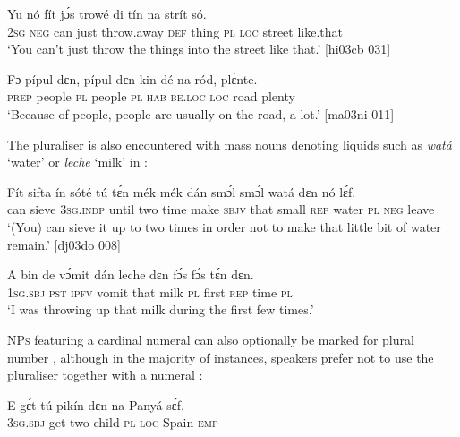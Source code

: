 \ea%
    \label{ex:key:207}
    \gll Yu  nó  fít  jɔ́s  trowé    di  tín    na  strít    só.\\
\textsc{2sg}  \textsc{neg}  can  just  throw.away  \textsc{def}  thing  \textsc{pl}  \textsc{loc}  street  like.that\\

\glt ‘You can’t just throw the things into the street like that.’ [hi03cb 031]
\z


\ea%
    \label{ex:key:208}
    \gll Fɔ  pípul  dɛn,    pípul  dɛn  kin  dé    na  ród,    plɛ́nte.\\
\textsc{prep}  people  \textsc{pl}    people  \textsc{pl}  \textsc{hab}  \textsc{be.loc}  \textsc{loc}  road    plenty\\

\glt ‘Because of people, people are usually on the road, a lot.’ [ma03ni 011]
\z

The pluraliser is also encountered with mass nouns denoting liquids such as \textit{watá} ‘water’  or \textit{leche} ‘milk’ in :


\ea%
    \label{ex:key:209}
    \gll Fít  sifta    ín    sóté    tú  tɛ́n    mék    mék  
dán  smɔ́l  smɔ́l  watá  dɛn  nó  lɛ́f.\\
can  sieve  \textsc{3sg.indp}  until  two  time    make  \textsc{sbjv}
that  small  \textsc{rep}    water  \textsc{pl}  \textsc{neg}  leave\\

\glt ‘(You) can sieve it up to two times in order not to make that 
little bit of water remain.’ [dj03do 008]
\z


\ea%
    \label{ex:key:210}
    \gll A    bin  de  vɔ́mit  dán  leche  dɛn  fɔ́s  fɔ́s  tɛ́n    dɛn.\\
\textsc{1sg.sbj}  \textsc{pst}  \textsc{ipfv}  vomit  that  milk    \textsc{pl}  first \textsc{rep}  time    \textsc{pl}\\
\glt ‘I was throwing up that milk during the first few times.’\textstylePichiglossZchn{ [ed03sp 104]}
\z

\textsc{NPs} featuring a cardinal numeral can also optionally be marked for plural number , although in the majority of instances, speakers prefer not to use the pluraliser together with a numeral : 


\ea%
    \label{ex:key:211}
    \gll E    gɛ́t  tú  pikín  dɛn  na  Panyá  sɛ́f.\\
\textsc{3sg.sbj}  get  two  child  \textsc{pl}  \textsc{loc}  Spain  \textsc{emp}\\

